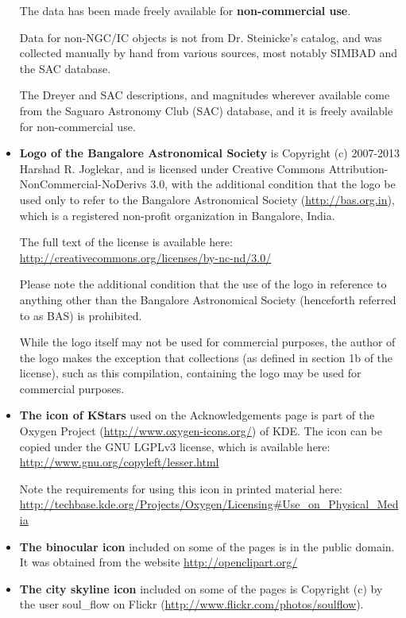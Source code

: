 \begin{itemize}
  The data has been made freely available for \textbf{non-commercial
    use}.

  Data for non-NGC/IC objects is not from Dr. Steinicke's catalog, and
  was collected manually by hand from various sources, most notably
  SIMBAD and the SAC database.

  The Dreyer and SAC descriptions, and magnitudes wherever available
  come from the Saguaro Astronomy Club (SAC) database, and it is
  freely available for non-commercial use.

\item \textbf{Logo of the Bangalore Astronomical Society} is Copyright
  (c) 2007-2013 Harshad R. Joglekar, and is licensed under Creative
  Commons Attribution-NonCommercial-NoDerivs 3.0, with the additional
  condition that the logo be used only to refer to the Bangalore
  Astronomical Society (\url{http://bas.org.in}), which is a
  registered non-profit organization in Bangalore, India. 

  The full text of the license is available here:
  \url{http://creativecommons.org/licenses/by-nc-nd/3.0/}

  Please note the additional condition that the use of the logo in
  reference to anything other than the Bangalore Astronomical Society
  (henceforth referred to as BAS) is prohibited.

  While the logo itself may not be used for commercial purposes, the
  author of the logo makes the exception that collections (as defined
  in section 1b of the license), such as this compilation, containing
  the logo may be used for commercial purposes.

\item \textbf{The icon of KStars} used on the Acknowledgements page is
  part of the Oxygen Project (\url{http://www.oxygen-icons.org/}) of
  KDE. The icon can be copied under the GNU LGPLv3 license, which is
  available here: \url{http://www.gnu.org/copyleft/lesser.html}

  Note the requirements for using this icon in printed material here:
  \url{http://techbase.kde.org/Projects/Oxygen/Licensing#Use_on_Physical_Media}

\item \textbf{The binocular icon} included on some of the pages is in
  the public domain. It was obtained from the website
  \url{http://openclipart.org/}
  
\item \textbf{The city skyline icon} included on some of the pages is
  Copyright (c) by the user soul\_flow on Flickr
  (\url{http://www.flickr.com/photos/soulflow}).


\end{itemize}
